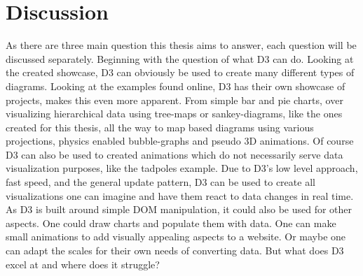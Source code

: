 \chapter{Discussion}

As there are three main question this thesis aims to answer, each question will be discussed separately. Beginning with the question of what D3 can do. Looking at the created showcase, D3 can obviously be used to create many different types of diagrams. Looking at the examples found online, D3 has their own showcase of projects, makes this even more apparent. From simple bar and pie charts, over visualizing hierarchical data using tree-maps or sankey-diagrams, like the ones created for this thesis, all the way to map based diagrams using various projections\cite{davies}, physics enabled bubble-graphs\cite{carter_2012} and pseudo 3D animations\cite{davies_sphere}. Of course D3 can also be used to created animations which do not necessarily serve data visualization purposes, like the tadpoles example\cite{bostock_2020}. Due to D3's low level approach, fast speed, and the general update pattern, D3 can be used to create all visualizations one can imagine and have them react to data changes in real time. As D3 is built around simple DOM manipulation, it could also be used for other aspects. One could draw charts and populate them with data. One can make small animations to add visually appealing aspects to a website. Or maybe one can adapt the scales for their own needs of converting data. But what does D3 excel at and where does it struggle?

